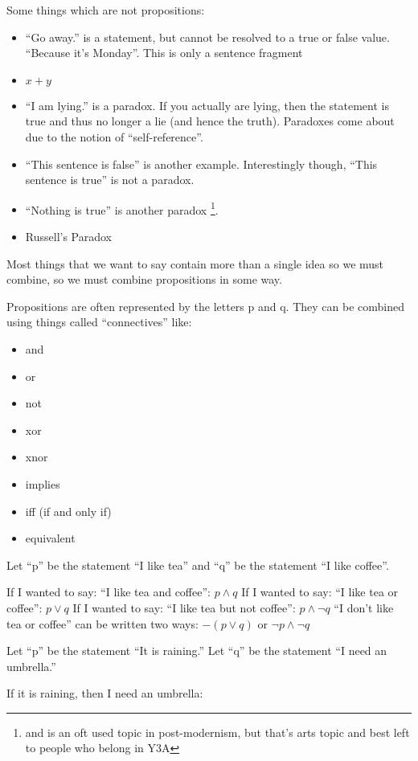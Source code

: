 Some things which are not propositions:
\begin{itemize}
  \item ``Go away.'' is a statement, but cannot be resolved to a true or false
  value. ``Because it's Monday''. This is only a sentence fragment 
  \item $ x + y $
  \item ``I am lying.'' is a paradox. If you actually are lying, then the
  statement is true and thus no longer a lie (and hence the truth). Paradoxes come about due to
the notion of ``self-reference''.
  \item ``This sentence is false'' is another example. Interestingly though,
  ``This sentence is true'' is not a paradox.
  \item ``Nothing is true'' is another paradox \footnote{and is an oft used
  topic in post-modernism, but that's arts topic and best left to people who
  belong in Y3A}.
  \item Russell's Paradox
\end{itemize}

Most things that we want to say contain more than a single idea so we must
combine, so we must combine propositions in some way.

Propositions are often represented by the letters p and q. They can be combined
using things called ``connectives'' like:
\begin{itemize}
  \item and
  \item or
  \item not
  \item xor
  \item xnor
  \item implies
  \item iff (if and only if)
  \item equivalent
\end{itemize}

Let ``p'' be the statement ``I like tea'' and ``q'' be the statement ``I like
coffee''.

If I wanted to say: ``I like tea and coffee'': $p \land q$
If I wanted to say: ``I like tea or coffee'': $p \lor q$
If I wanted to say: ``I like tea but not coffee'': $p \land \lnot q$
``I don't like tea or coffee'' can be written two ways: $ -(p \lor q)$ or $\lnot p
\land \lnot q $

Let ``p'' be the statement ``It is raining.''
Let ``q'' be the statement ``I need an umbrella.''

If it is raining, then I need an umbrella:

